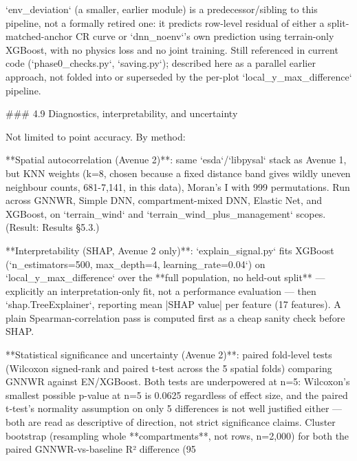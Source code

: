\documentclass[11pt,a4paper]{report}
\begin{document}
`env_deviation` (a smaller, earlier module) is a predecessor/sibling to this pipeline, not a formally retired one: it predicts row-level residual of either a split-matched-anchor CR curve or `dnn_noenv`'s own prediction using terrain-only XGBoost, with no physics loss and no joint training. Still referenced in current code (`phase0_checks.py`, `saving.py`); described here as a parallel earlier approach, not folded into or superseded by the per-plot `local_y_max_difference` pipeline.

### 4.9 Diagnostics, interpretability, and uncertainty

Not limited to point accuracy. By method:

**Spatial autocorrelation (Avenue 2)**: same `esda`/`libpysal` stack as Avenue 1, but KNN weights (k=8, chosen because a fixed distance band gives wildly uneven neighbour counts, 681-7,141, in this data), Moran's I with 999 permutations. Run across GNNWR, Simple DNN, compartment-mixed DNN, Elastic Net, and XGBoost, on `terrain_wind` and `terrain_wind_plus_management` scopes. (Result: Results §5.3.)

**Interpretability (SHAP, Avenue 2 only)**: `explain_signal.py` fits XGBoost (`n_estimators=500, max_depth=4, learning_rate=0.04`) on `local_y_max_difference` over the **full population, no held-out split** — explicitly an interpretation-only fit, not a performance evaluation — then `shap.TreeExplainer`, reporting mean |SHAP value| per feature (17 features). A plain Spearman-correlation pass is computed first as a cheap sanity check before SHAP.

**Statistical significance and uncertainty (Avenue 2)**: paired fold-level tests (Wilcoxon signed-rank and paired t-test across the 5 spatial folds) comparing GNNWR against EN/XGBoost. Both tests are underpowered at n=5: Wilcoxon's smallest possible p-value at n=5 is 0.0625 regardless of effect size, and the paired t-test's normality assumption on only 5 differences is not well justified either — both are read as descriptive of direction, not strict significance claims. Cluster bootstrap (resampling whole **compartments**, not rows, n=2,000) for both the paired GNNWR-vs-baseline R² difference (95%
\end{document}
